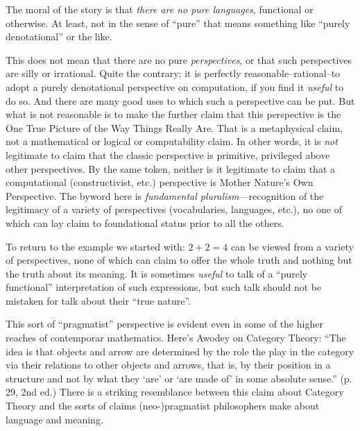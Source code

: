 \begin{ednote}

  The moral of the story is that \emph{there are no pure languages},
  functional or otherwise.  At least, not in the sense of ``pure''
  that means something like ``purely denotational'' or the like.

  This does not mean that there are no pure \emph{perspectives}, or
  that such perspectives are silly or irrational.  Quite the contrary;
  it is perfectly reasonable--rational--to adopt a purely denotational
  perspective on computation, if you find it \emph{useful} to do so.
  And there are many good uses to which such a perspective can be put.
  But what is not reasonable is to make the further claim that this
  perspective is the One True Picture of the Way Things Really Are.
  That is a metaphysical claim, not a mathematical or logical or
  computability claim.  In other words, it is \emph{not} legitimate to
  claim that the classic perspective is primitive, privileged above
  other perspectives.  By the same token, neither is it legitimate to
  claim that a computational (constructivist, etc.) perspective is
  Mother Nature's Own Perspective.  The byword here is
  \emph{fundamental pluralism}---recognition of the legitimacy of a
  variety of perspectives (vocabularies, languages, etc.), no one of
  which can lay claim to foundational status prior to all the others.

  To return to the example we started with: \(2+2=4\) can be viewed
  from a variety of perspectives, none of which can claim to offer the
  whole truth and nothing but the truth about its meaning.  It is
  sometimes \emph{useful} to talk of a ``purely functional''
  interpretation of such expressions, but such talk should not be
  mistaken for talk about their ``true nature''.
\end{ednote}

\begin{ednote}
  This sort of ``pragmatist'' perspective is evident even in some of
  the higher reaches of contemporar mathematics.  Here's Awodey on
  Category Theory: ``The idea is that objects and arrow are determined
  by the role the play in the category via their relations to other
  objects and arrows, that is, by their position in a structure and
  not by what they `are' or `are made of' in some absolute sense.''
  (p. 29, 2nd ed.)  There is a striking resemblance between this claim
  about Category Theory and the sorts of claims (neo-)pragmatist
  philosophers make about language and meaning.
\end{ednote}

